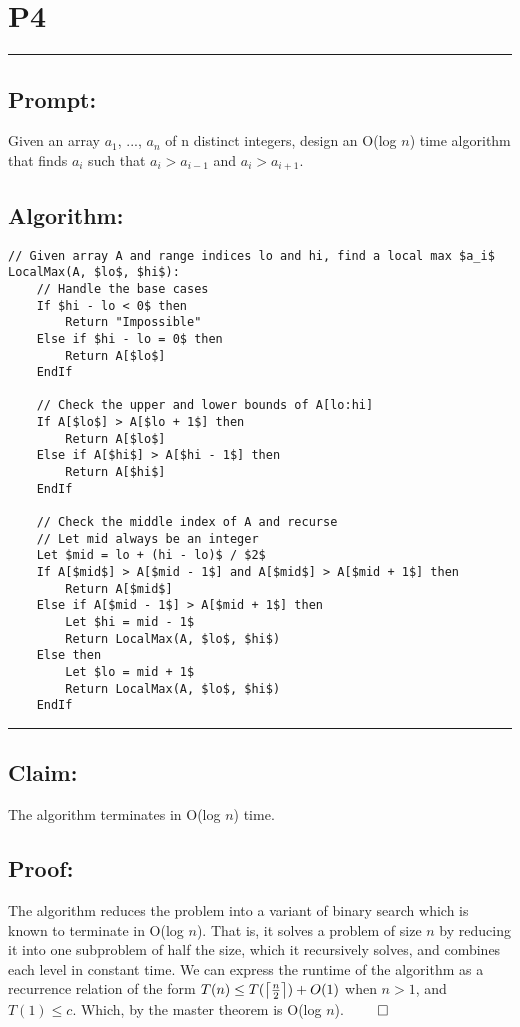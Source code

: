 \documentclass[11pt]{article}
\title{}
\author{}
\date{}
\DeclarePairedDelimiter\ceil{\lceil}{\rceil}
\begin{document}
\section*{P4}

\noindent\textcolor[RGB]{220,220,220}{\rule{\linewidth}{0.8pt}}

\subsection*{Prompt:} 
Given an array $a_1$, ..., $a_n$ of n distinct integers, design an O(log $n$) time algorithm that finds $a_i$ such that $a_i > a_{i-1}$ and $a_i > a_{i+1}$.

\subsection*{Algorithm:} 
\begin{lstlisting}[basicstyle=\small, mathescape=true]
// Given array A and range indices lo and hi, find a local max $a_i$
LocalMax(A, $lo$, $hi$):
	// Handle the base cases
	If $hi - lo < 0$ then
		Return "Impossible"
	Else if $hi - lo = 0$ then
		Return A[$lo$]
	EndIf

	// Check the upper and lower bounds of A[lo:hi]
	If A[$lo$] > A[$lo + 1$] then
		Return A[$lo$]
	Else if A[$hi$] > A[$hi - 1$] then
		Return A[$hi$]
	EndIf

	// Check the middle index of A and recurse
	// Let mid always be an integer
    Let $mid = lo + (hi - lo)$ / $2$
	If A[$mid$] > A[$mid - 1$] and A[$mid$] > A[$mid + 1$] then
		Return A[$mid$]
	Else if A[$mid - 1$] > A[$mid + 1$] then
        Let $hi = mid - 1$
		Return LocalMax(A, $lo$, $hi$)
	Else then
        Let $lo = mid + 1$
		Return LocalMax(A, $lo$, $hi$)
	EndIf
\end{lstlisting}

\noindent\textcolor[RGB]{220,220,220}{\rule{\linewidth}{0.8pt}}
\linebreak

\subsection*{Claim:} 

The algorithm terminates in O(log $n$) time.

\subsection*{Proof:} 

The algorithm reduces the problem into a variant of binary search which is known to terminate in O(log $n$). That is, it solves a problem of size $n$ by reducing it into one subproblem of half the size, which it recursively solves, and combines each level in constant time. We can express the runtime of the algorithm as a recurrence relation of the form $T(n) \leq T(\ceil*{\frac{n}{2}}) + O(1)$ when $n > 1$, and $T(1) \leq c$. Which, by the master theorem is O(log $n$). $\qed$
\end{document}
